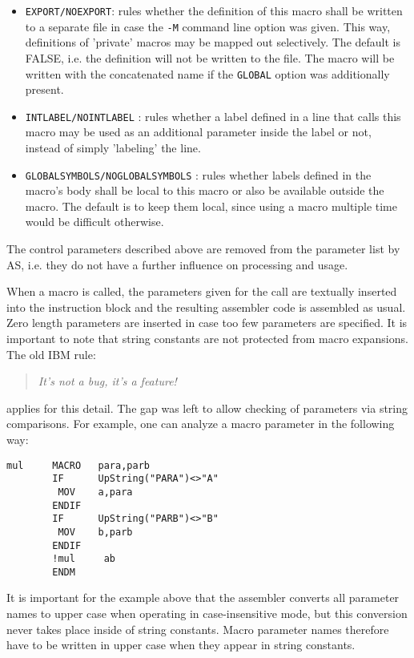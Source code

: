 \documentclass[12pt,twoside]{report}
\newcommand{\tty}[1]{{\tt #1}}
\newcommand{\asname}{{AS}}
\begin{document}
\begin{itemize}
{      section \tty{B} that is a child section of section \tty{C}, an additional
      global macro named \tty{C\_B\_A} would be generated.  In contrast, if
      \tty{C} had been specified as target section, the macro would be named \tty{B\_A}
      and be assigned to section \tty{C}.  This option is turned off by default
      and it only has an effect when it is used from within a section.
      The macro defined locally is not influenced by this option.}
\item{\tty{EXPORT/NOEXPORT}: rules whether the definition of this macro
      shall be written to a separate file in case the \tty{-M} command line
      option was given.  This way, definitions of 'private' macros may
      be mapped out selectively.  The default is FALSE, i.e. the
      definition will not be written to the file.  The macro will be
      written with the concatenated name if the \tty{GLOBAL} option was
      additionally present.}
\item{\tty{INTLABEL/NOINTLABEL} : rules whether a label defined in a line
      that calls this macro may be used as an additional parameter inside
      the label or not, instead of simply 'labeling' the line.}
\item{\tty{GLOBALSYMBOLS/NOGLOBALSYMBOLS} : rules whether labels
      defined in the macro's body shall be local to this macro or
      also be available outside the macro.  The default is to
      keep them local, since using a macro multiple time would be
      difficult otherwise.}
\end{itemize}
The control parameters described above are removed from the parameter
list by \asname{}, i.e. they do not have a further influence on processing
and usage.

When a macro is called, the parameters given for the call are
textually inserted into the instruction block and the resulting
assembler code is assembled as usual.  Zero length parameters are
inserted in case too few parameters are specified.  It is important
to note that string constants are not protected from macro
expansions.  The old IBM rule:
\begin{quote}{\it
 It's not a bug, it's a feature!
}\end{quote}
applies for this detail.  The gap was left to allow checking of
parameters via string comparisons.  For example, one can analyze a
macro parameter in the following way:
\begin{verbatim}
mul     MACRO   para,parb
        IF      UpString("PARA")<>"A"
         MOV    a,para
        ENDIF
        IF      UpString("PARB")<>"B"
         MOV    b,parb
        ENDIF
        !mul     ab
        ENDM
\end{verbatim}
It is important for the example above that the assembler converts all
parameter names to upper case when operating in case-insensitive
mode, but this conversion never takes place inside of string constants.
Macro parameter names therefore have to be written in upper case when
they appear in string constants.
\end{document}
